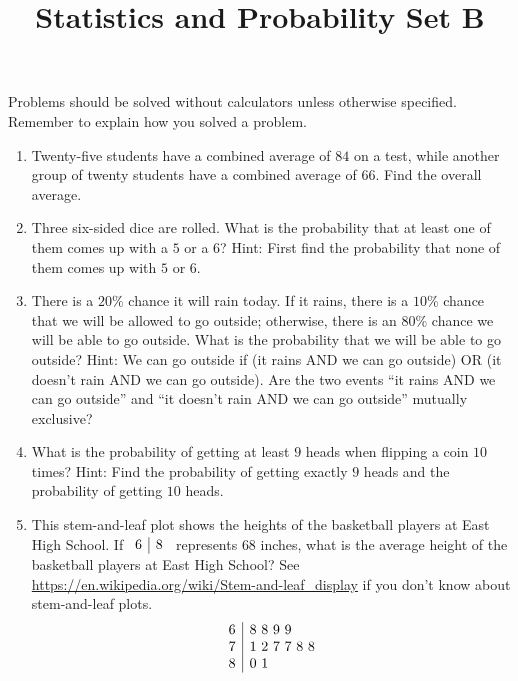 \documentclass{article}
\title{Statistics and Probability Set B}
\author{}
\date{}
\begin{document}
\maketitle
\noindent Problems should be solved without calculators unless otherwise
specified.  Remember to explain how you solved a problem.
\begin{enumerate}
    \item Twenty-five students have a combined average of $84$ on a test, while
        another group of twenty students have a combined average of $66$. Find
        the overall average.
        \vspace{3cm}
    \item Three six-sided dice are rolled. What is the probability that at least
        one of them comes up with a $5$ or a $6$? Hint: First find the
        probability that none of them comes up with $5$ or $6$.
        \vspace{3cm}
    \item There is a $20\%$ chance it will rain today. If it rains, there is a
        $10\%$ chance that we will be allowed to go outside; otherwise, there is
        an $80\%$ chance we will be able to go outside. What is the probability
        that we will be able to go outside? Hint: We can go outside if (it rains
        AND we can go outside) OR (it doesn't rain AND we can go outside). Are
        the two events ``it rains AND we can go outside'' and ``it doesn't rain
        AND we can go outside'' mutually exclusive?
        \vspace{3cm}
    \item What is the probability of getting at least $9$ heads when flipping a
        coin $10$ times? Hint: Find the probability of getting exactly $9$ heads
        and the probability of getting $10$ heads.
        \vspace{3cm}
    \item This stem-and-leaf plot shows the heights of the basketball players at
        East High School. If $\begin{array}{r | l} 6 & 8 \end{array}$ represents 
        $68$ inches, what is the average height of the basketball players at 
        East High School? See        
        \url{https://en.wikipedia.org/wiki/Stem-and-leaf_display} if you don't 
        know about stem-and-leaf plots.
        \[
            \begin{array}{r | l}
                6 & 8~8~9~9 \\
                7 & 1~2~7~7~8~8 \\
                8 & 0~1
            \end{array}
        \]
        \vspace{3cm}
\end{enumerate}
\end{document}
